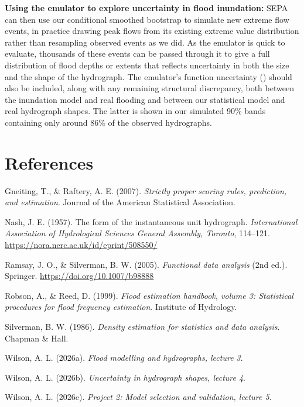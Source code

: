 \documentclass[
  11pt,
  a4paper]{article}
\newlength{\cslhangindent}
\newenvironment{CSLReferences}[2] %
 {\begin{list}{}{%
  \setlength{\itemindent}{0pt}
  \setlength{\leftmargin}{0pt}
  \setlength{\parsep}{0pt}
  \ifodd #1
   \setlength{\leftmargin}{\cslhangindent}
   \setlength{\itemindent}{-1\cslhangindent}
  \fi
  \setlength{\itemsep}{#2\baselineskip}}}
 {\end{list}}
\begin{document}
\textbf{Using the emulator to explore uncertainty in flood inundation:} SEPA can then use our conditional smoothed bootstrap to simulate new extreme flow events, in practice drawing peak flows from its existing extreme value distribution rather than resampling observed events as we did. As the emulator is quick to evaluate, thousands of these events can be passed through it to give a full distribution of flood depths or extents that reflects uncertainty in both the size and the shape of the hydrograph. The emulator's function uncertainty () should also be included, along with any remaining structural discrepancy, both between the inundation model and real flooding and between our statistical model and real hydrograph shapes. The latter is shown in our simulated 90\% bands containing only around 86\% of the observed hydrographs.

\section{References}\label{references}

\protect{}\label{refs}
\begin{CSLReferences}{1}{0}
Gneiting, T., \& Raftery, A. E. (2007). \emph{Strictly proper scoring rules, prediction, and estimation}. Journal of the American Statistical Association.

Nash, J. E. (1957). The form of the instantaneous unit hydrograph. \emph{International Association of Hydrological Sciences General Assembly, Toronto}, 114--121. \url{https://nora.nerc.ac.uk/id/eprint/508550/}

Ramsay, J. O., \& Silverman, B. W. (2005). \emph{Functional data analysis} (2nd ed.). Springer. \url{https://doi.org/10.1007/b98888}

Robson, A., \& Reed, D. (1999). \emph{Flood estimation handbook, volume 3: Statistical procedures for flood frequency estimation}. Institute of Hydrology.

Silverman, B. W. (1986). \emph{Density estimation for statistics and data analysis}. Chapman \& Hall.

Wilson, A. L. (2026a). \emph{Flood modelling and hydrographs, lecture 3}.

Wilson, A. L. (2026b). \emph{Uncertainty in hydrograph shapes, lecture 4}.

Wilson, A. L. (2026c). \emph{Project 2: Model selection and validation, lecture 5}.

\end{CSLReferences}
\end{document}

